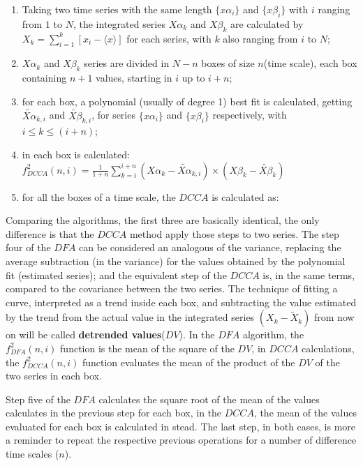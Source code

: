 \documentclass[article]{jss}
\begin{document}
\begin{enumerate}
  \label{steps:DCCA}
  \item Taking two time series with the same length $\{x\alpha_{i}\}$ and $\{x\beta_{i}\}$ with $i$ ranging from $1$ to $N$,
        the integrated series $X\alpha_{k}$ and $X\beta_{k}$ are calculated by
        $X_{k} = \sum_{i=1}^{k}\left[x_{i} - \langle x \rangle \right] $ for each series, with $k$ also ranging from $i$ to $N$;
  \item $X\alpha_{k}$ and $X\beta_{k}$ series are divided in $N - n$ boxes of size $n$(time scale), each box containing $n + 1$ values, starting in $i$ up to $i + n$;
  \item for each box, a polynomial (usually of degree 1) best fit is calculated, getting
        $\widetilde{X\alpha}_{k, i}$ and $\widetilde{X\beta}_{k, i}$,
        for series $\{x\alpha_{i}\}$ and $\{x\beta_{i}\}$ respectively,
        with $i \le k \le (i + n)$;
  \item in each box is calculated: $f_{DCCA}^{2}(n, i) =
          \frac{1}{1+n} \sum_{k=i}^{i + n}(X\alpha_{k}-\widetilde{X\alpha}_{k, i}) \times (X\beta_{k}-\widetilde{X\beta}_{k})$
  \item for all the boxes of a time scale, the $DCCA$ is calculated as:\\[10pt]
\end{enumerate}

Comparing the algorithms, the first three are basically identical, the only difference is that the $DCCA$ method apply those steps to two series. The step four of the $DFA$ can be considered an analogous of the variance, replacing the average subtraction (in the variance) for the values obtained by the polynomial fit (estimated series); and the equivalent step of the $DCCA$ is, in the same terms, compared to the covariance between the two series. The technique of fitting a curve, interpreted as a trend inside each box, and subtracting the value estimated by the trend from the actual value in the integrated series $(X_{k}-\widetilde{X}_{k})$ from now on will be called \textbf{detrended values}($DV$). In the $DFA$ algorithm, the $f_{DFA}^{2}(n, i)$ function is the mean of the square of the $DV$, in $DCCA$ calculations, the $f_{DCCA}^{2}(n, i)$ function evaluates the mean of the product of the $DV$ of the two series in each box.

Step five of the $DFA$ calculates the square root of the mean of the values calculates in the previous step for each box, in the $DCCA$, the mean of the values evaluated for each box is calculated in stead. The last step, in both cases, is more a reminder to repeat the respective previous operations for a number of difference time scales ($n$).
\end{document}
